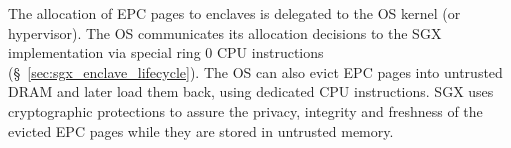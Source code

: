 The allocation of EPC pages to enclaves is delegated to the OS kernel (or
hypervisor). The OS communicates its allocation decisions to the SGX
implementation via special ring 0 CPU instructions
(\S~\ref{sec:sgx_enclave_lifecycle}). The OS can also evict EPC pages into
untrusted DRAM and later load them back, using dedicated CPU instructions. SGX
uses cryptographic protections to assure the privacy, integrity and freshness
of the evicted EPC pages while they are stored in untrusted memory.
